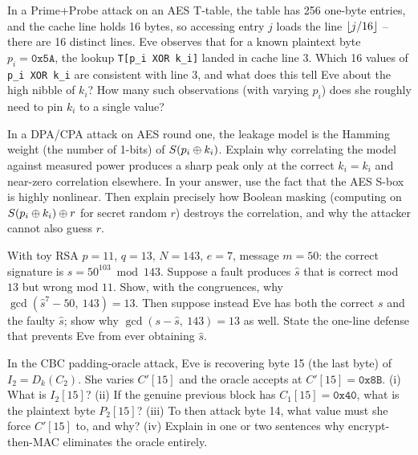 \begin{exercise}
\label{ch37:ex-cache}
In a Prime+Probe attack on an AES T-table, the table has 256 one-byte entries, and the cache line holds 16 bytes, so accessing entry $j$ loads the line $\lfloor j/16\rfloor$ -- there are 16 distinct lines. Eve observes that for a known plaintext byte $p_i = \texttt{0x5A}$, the lookup \texttt{T[p\_i XOR k\_i]} landed in cache line $3$. Which 16 values of \texttt{p\_i XOR k\_i} are consistent with line $3$, and what does this tell Eve about the high nibble of $k_i$? How many such observations (with varying $p_i$) does she roughly need to pin $k_i$ to a single value?
\end{exercise}

\begin{exercise}
\label{ch37:ex-dpa}
In a DPA/CPA attack on AES round one, the leakage model is the Hamming weight (the number of 1-bits) of $S(p_i \oplus k_i)$. Explain why correlating the model against measured power produces a sharp peak only at the correct $\hat{k}_i = k_i$ and near-zero correlation elsewhere. In your answer, use the fact that the AES S-box is highly nonlinear. Then explain precisely how Boolean masking (computing on $S(p_i \oplus k_i) \oplus r$ for secret random $r$) destroys the correlation, and why the attacker cannot also guess $r$.
\end{exercise}

\begin{exercise}
\label{ch37:ex-bellcore}
With toy RSA $p = 11$, $q = 13$, $N = 143$, $e = 7$, message $m = 50$: the correct signature is $s = 50^{103} \bmod 143$. Suppose a fault produces $\hat{s}$ that is correct mod $13$ but wrong mod $11$. Show, with the congruences, why $\gcd(\hat{s}^{7} - 50,\ 143) = 13$. Then suppose instead Eve has both the correct $s$ and the faulty $\hat{s}$; show why $\gcd(s - \hat{s},\ 143) = 13$ as well. State the one-line defense that prevents Eve from ever obtaining $\hat{s}$.
\end{exercise}

\begin{exercise}
\label{ch37:ex-cbc-oracle}
In the CBC padding-oracle attack, Eve is recovering byte 15 (the last byte) of $I_2 = D_k(C_2)$. She varies $C'[15]$ and the oracle accepts at $C'[15] = \texttt{0x8B}$. (i) What is $I_2[15]$? (ii) If the genuine previous block has $C_1[15] = \texttt{0x40}$, what is the plaintext byte $P_2[15]$? (iii) To then attack byte 14, what value must she force $C'[15]$ to, and why? (iv) Explain in one or two sentences why encrypt-then-MAC eliminates the oracle entirely.
\end{exercise}


